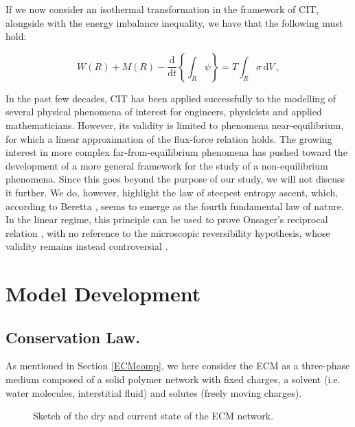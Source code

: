 \documentclass[runningheads]{llncs}
\renewcommand{\d}{\ensuremath{\text{d}}}
\begin{document}
If we now consider an isothermal transformation in the framework of CIT, alongside with the energy imbalance inequality, we have that the following must hold:

\begin{equation}
W(R)+M(R)-\frac{\d}{\d t} \left\{\int_R \psi \right\} = T \int_R \sigma \,\d V\, ,
\label{eqCIT}
\end{equation}

In the past few decades, CIT has been applied successfully to the modelling of several physical phenomena of interest for engineers, physicists and applied mathematicians. However, its validity is limited to phenomena near-equilibrium, for which a linear approximation of the flux-force relation holds. The growing interest in more complex far-from-equilibrium phenomena has pushed toward the development of a more general framework for the study of a non-equilibrium phenomena. Since this goes beyond the purpose of our study, we will not discuss it further. We do, however, highlight the law of steepest entropy ascent, which, according to Beretta \cite{SEA2}, seems to emerge as the fourth fundamental law of nature. In the linear regime, this principle can be used to prove Onsager's reciprocal relation \cite{SEA1}, with no reference to the microscopic reversibility hypothesis, whose validity remains instead controversial \cite{CIT}.

\section{Model Development}
\label{modeldev}
\subsection{Conservation Law.}
\label{conslaw}
As mentioned in Section \ref{ECMcomp}, we here consider the ECM as a three-phase medium composed of a solid polymer network with fixed charges, a solvent (i.e. water molecules, interstitial fluid) and solutes (freely moving charges). 
\begin{figure}[h!]
	\centering
	\def\svgwidth{0.9\linewidth}
	
	\caption{Sketch of the dry and current state of the ECM network.}
	\label{Above}
\end{figure}
\end{document}
